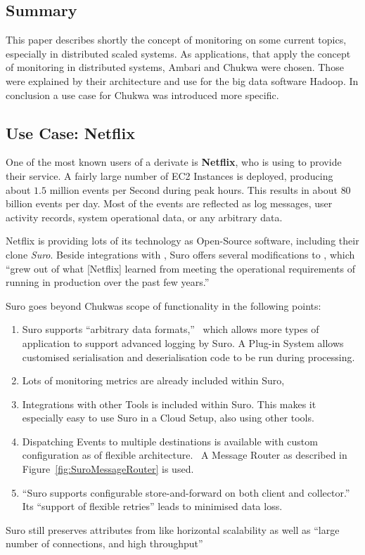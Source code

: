 \subsection{Summary}
This paper describes shortly the concept of monitoring on some current topics, especially in distributed scaled systems. As applications, that apply the concept of monitoring in distributed systems, Ambari and Chukwa were chosen. Those were explained by their architecture and use for the big data software Hadoop. In conclusion a use case for Chukwa was introduced more specific. 

\subsection{Use Case: Netflix}
\label{netflix}
One of the most known users of a \chuk derivate is \textbf{Netflix}, who is using \aws to provide their service. 
A fairly large number of \aws EC2 Instances is deployed, producing about $1.5$ million events per Second during peak hours. 
This results in about $80$ billion events per day. 
Most of the events are reflected as log messages, user activity records, system operational data, or any arbitrary data.~\cite{Bae2013}

Netflix is providing lots of its technology as Open-Source software, including their \chuk clone \textit{Suro}. 
Beside integrations with \noss, Suro offers several modifications to \chuk, which ``grew out of what [Netflix] learned from meeting the operational requirements of running in production over the past few years.''~\cite{Bae2013}

Suro goes beyond Chukwas scope of functionality in the following points:
\begin{enumerate}
  \item Suro supports ``arbitrary data formats,''~\cite{Bae2013} which allows more types of application to support advanced logging by Suro. A Plug-in System allows customised serialisation and deserialisation code to be run during processing.
  \item Lots of monitoring metrics are already included within Suro, 
  \item Integrations with other \noss Tools is included within Suro. This makes it especially easy to use Suro in a Cloud Setup, also using other \noss tools.~\cite{GithubNetflixSuro}
  \item \label{itm:SutoMultiDest} Dispatching Events to multiple destinations is available with custom configuration as of flexible architecture.~\cite{Bae2013, GithubNetflixSuro} A Message Router as described in Figure~\ref{fig:SuroMessageRouter} is used.
  \item ``Suro supports configurable store-and-forward on both client and collector.''~\cite{Bae2013} Its ``support of flexible retries'' leads to minimised data loss.~\cite{GithubNetflixSuro}
\end{enumerate}
Suro still preserves attributes from \chuk like horizontal scalability as well as ``large number of connections, and high throughput''~\cite{GithubNetflixSuro}

